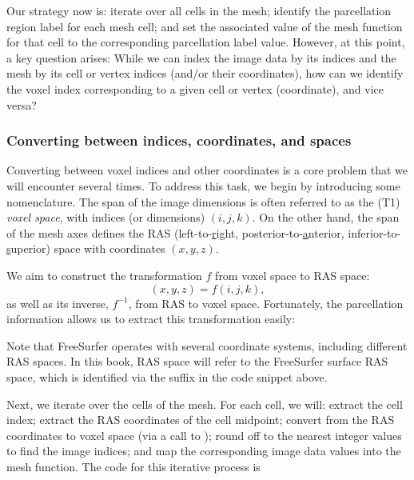 Our strategy now is: iterate over all cells in the mesh; identify the
parcellation region label for each mesh cell; and set the associated
value of the mesh function for that cell to the corresponding
parcellation label value. However, at this point, a key question
arises: While we can index the image data by its indices and the
mesh by its cell or vertex indices (and/or their coordinates), how can
we identify the voxel index corresponding to a given cell or vertex
(coordinate), and vice versa?

\subsubsection*{Converting between indices, coordinates, and spaces}

Converting between voxel indices and other coordinates is a core
problem that we will encounter several times. To address this task, we
begin by introducing some nomenclature. The span of the image
dimensions is often referred to as the (T1) \emph{voxel space}, with
indices (or dimensions) $(i, j, k)$. On the other hand, the span of
the mesh axes defines the RAS (left-to-\underline{r}ight, 
posterior-to-\underline{a}nterior, inferior-to-\underline{s}uperior) space 
with coordinates $(x, y, z)$. 

We aim to
construct the transformation $f$ from voxel space to RAS space:
\begin{equation}
  (x, y, z) = f(i, j, k),
\end{equation}
as well as its inverse, $f^{-1}$, from RAS to voxel space. Fortunately,
the parcellation information allows us to extract this transformation easily:

\noindent Note that FreeSurfer operates with several coordinate
systems, including different RAS spaces. In this book, RAS space will
refer to the FreeSurfer surface RAS space, which is identified
via the suffix  in the code snippet above.

Next, we iterate over the cells of the mesh. For each cell, we will: 
extract the cell index; extract the RAS coordinates of the cell 
midpoint; convert from the RAS coordinates to voxel space (via a call to 
); round off to the nearest integer values to find the 
image indices; and map the corresponding image data values into the 
 mesh function. The code for this iterative process is

